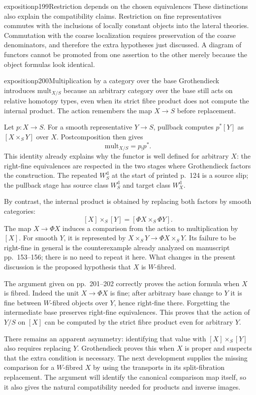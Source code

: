 \begin{dcomment}{exposition}{p199}{Restriction depends on the chosen equivalences}
These distinctions also explain the compatibility claims. Restriction on fine representatives commutes with the inclusions of locally constant objects into the lateral theories. Commutation with the coarse localization requires preservation of the coarse denominators, and therefore the extra hypotheses just discussed. A diagram of functors cannot be promoted from one assertion to the other merely because the object formulas look identical.
\end{dcomment}

\begin{dcomment}{exposition}{p200}{Multiplication by a category over the base}
Grothendieck introduces $\mathrm{mult}_{X/S}$ because an arbitrary category over the base still acts on relative homotopy types, even when its strict fibre product does not compute the internal product. The action remembers the map $X\to S$ before replacement.

Let $p:X\to S$. For a smooth representative $Y\to S$, pullback computes $p^*[Y]$ as $[X\times_S Y]$ over $X$. Postcomposition then gives
\[
 \mathrm{mult}_{X/S}=p_!p^*.
\]
This identity already explains why the functor is well defined for arbitrary $X$: the right-fine equivalences are respected in the two stages where Grothendieck factors the construction. The repeated $W_S^{\mathrm d}$ at the start of printed p.~124 is a source slip; the pullback stage has source class $W_S^{\mathrm d}$ and target class $W_X^{\mathrm d}$.

By contrast, the internal product is obtained by replacing both factors by smooth categories:
\[
 [X]\times_S[Y]=[\Phi X\times_S\Phi Y].
\]
The map $X\to\Phi X$ induces a comparison from the action to multiplication by $[X]$. For smooth $Y$, it is represented by $X\times_S Y\to\Phi X\times_S Y$. Its failure to be right-fine in general is the counterexample already analyzed on manuscript pp.~153--156; there is no need to repeat it here. What changes in the present discussion is the proposed hypothesis that $X$ is $W$-fibred.

The argument given on pp.~201--202 correctly proves the action formula when $X$ is fibred. Indeed the unit $X\to\Phi X$ is fine; after arbitrary base change to $Y$ it is fine between $W$-fibred objects over $Y$, hence right-fine there. Forgetting the intermediate base preserves right-fine equivalences. This proves that the action of $Y/S$ on $[X]$ can be computed by the strict fibre product even for arbitrary $Y$.

There remains an apparent asymmetry: identifying that value with $[X]\times_S[Y]$ also requires replacing $Y$. Grothendieck proves this when $X$ is proper and suspects that the extra condition is necessary. The next development supplies the missing comparison for a $W$-fibred $X$ by using the transports in its split-fibration replacement. The argument will identify the canonical comparison map itself, so it also gives the natural compatibility needed for products and inverse images.
\end{dcomment}

